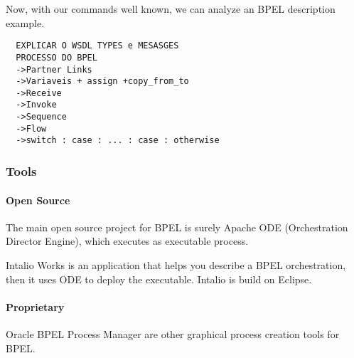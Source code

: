 \documentclass[12pt,a4paper]{article}
\begin{document}
Now, with our commands well known, we can analyze an BPEL description example.

\begin{center}
  \begin{verbatim}
  EXPLICAR O WSDL TYPES e MESASGES
  PROCESSO DO BPEL
  ->Partner Links
  ->Variaveis + assign +copy_from_to
  ->Receive
  ->Invoke
  ->Sequence
  ->Flow
  ->switch : case : ... : case : otherwise
  \end{verbatim}
\end{center}


\subsubsection{Tools}
\paragraph{Open Source}
The main open source project for BPEL is surely Apache ODE (Orchestration Director Engine), which executes as executable process.

Intalio Works is an application that helps you describe a BPEL orchestration, then it uses ODE to deploy the executable. Intalio is build on Eclipse.

\paragraph{Proprietary}
Oracle BPEL Process Manager are other graphical process creation tools for BPEL.
\end{document}

